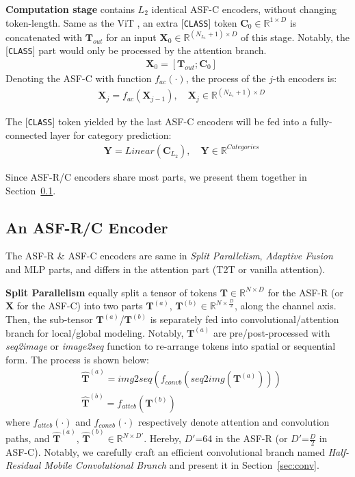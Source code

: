 \documentclass[lettersize,journal]{IEEEtran}
\begin{document}
\textbf{Computation stage} contains $L_2$ identical ASF-C encoders, without changing token-length. Same as the ViT \cite{dosovitskiy2021an}, an extra [{\tt CLASS}] token $\boldsymbol{C}_0 \in \mathbb{R}^{1\times D}$ is concatenated with $\boldsymbol{T}_{out}$ for an input $\boldsymbol{X}_{0}\in \mathbb{R}^{(N_{L_1}+1)\times D}$ of this stage. Notably, the [{\tt CLASS}] part would only be processed by the attention branch.
\begin{align}
    &\boldsymbol{X}_{0}=\left[\boldsymbol{T}_{out}; \boldsymbol{C}_0\right]
\end{align}
Denoting the ASF-C with function $f_{ac}\left(\cdot\right)$, the process of the $j$-th encoders is:
\begin{align}
    &\boldsymbol{X}_{j}=f_{ac}\left(\boldsymbol{X}_{j-1}\right), \quad \boldsymbol{X}_{j}\in \mathbb{R}^{(N_{L_1}+1)\times D}
\end{align}

The [{\tt CLASS}] token yielded by the last ASF-C encoders will be fed into a fully-connected layer for category prediction:
\begin{align}
    &\boldsymbol{Y}=Linear\left(\boldsymbol{C}_{L_2}\right), \quad \boldsymbol{Y}\in \mathbb{R}^{Categories}
\end{align}

Since ASF-R/C encoders share most parts, we present them together in Section~\ref{sec:enc}. 

\subsection{An ASF-R/C Encoder}
\label{sec:enc}
The ASF-R \& ASF-C encoders are same in \textit{Split Parallelism}, \textit{Adaptive Fusion} and MLP parts, and differs in the attention part (T2T or vanilla attention).

\textbf{Split Parallelism} equally split a tensor of tokens $\boldsymbol{T}\in\mathbb{R}^{N\times D}$ for the ASF-R (or $\boldsymbol{X}$ for the ASF-C) into two parts $\boldsymbol{T}^{(a)}$, $\boldsymbol{T}^{(b)} \in \mathbb{R}^{N \times \frac{D}{2}}$, along the channel axis. Then, the sub-tensor $\boldsymbol{T}^{(a)}$/$\boldsymbol{T}^{(b)}$ is separately fed into convolutional/attention branch for local/global modeling. Notably, $\boldsymbol{T}^{(a)}$ are pre/post-processed with \textit{seq2image} or \textit{image2seq} function \cite{yuan2021tokens} to re-arrange tokens into spatial or sequential form. The process is shown below:
\begin{align}
    &\boldsymbol{\hat{T}}^{(a)}=img2seq\left(f_{convb}\left(seq2img\left(\boldsymbol{T}^{(a)}\right)\right)\right)\\
    &\boldsymbol{\hat{T}}^{(b)}=f_{atteb}\left(\boldsymbol{T}^{(b)}\right)
\end{align}
where $f_{atteb}(\cdot)$ and $f_{convb}(\cdot)$ respectively denote attention and convolution paths, and $\boldsymbol{\hat{T}}^{(a)}$,  $\boldsymbol{\hat{T}}^{(b)}\in \mathbb{R}^{N\times D'}$. Hereby, $D'$=64  in the ASF-R (or $D'$=$\frac{D}{2}$ in ASF-C). Notably, we carefully craft an efficient convolutional branch named \textit{Half-Residual Mobile Convolutional Branch} and present it in Section~\ref{sec:conv}. 
\end{document}
